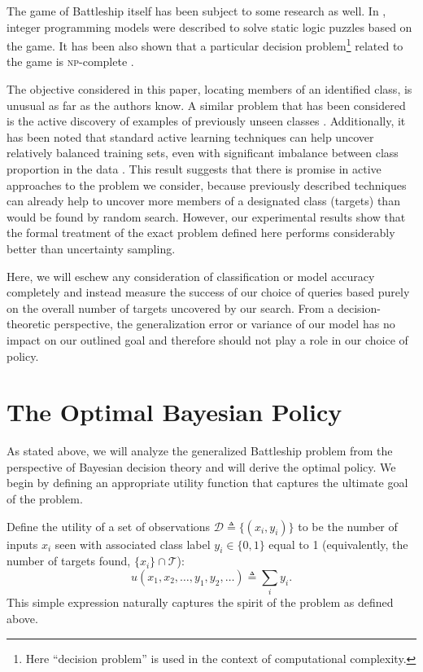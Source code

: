 \documentclass{acm_proc_article-sp}
\newcommand{\cm}[1]{\mathcal{#1}}
\newcommand{\data}{\cm{D}}
\begin{document}
The game of Battleship itself has been subject to some research as
well.  In \citep{solving}, integer programming models were described
to solve static logic puzzles based on the game.  It has been also
shown that a particular decision problem\footnote{Here ``decision
  problem'' is used in the context of computational complexity.}
related to the game is \textsc{np}-complete \citep{battleshipnp}.

The objective considered in this paper, locating members of an
identified class, is unusual as far as the authors know.  A similar
problem that has been considered is the active discovery of examples
of previously unseen classes \citep{rareclass}.  Additionally, it has
been noted that standard active learning techniques can help uncover
relatively balanced training sets, even with significant imbalance
between class proportion in the data \citep{activeimbalanced}.  This
result suggests that there is promise in active approaches to the
problem we consider, because previously described techniques can
already help to uncover more members of a designated class (targets)
than would be found by random search.  However, our experimental
results show that the formal treatment of the exact problem defined
here performs considerably better than uncertainty sampling.

Here, we will eschew any consideration of classification or model
accuracy completely and instead measure the success of our choice of
queries based purely on the overall number of targets uncovered by our
search.  From a decision-theoretic perspective, the generalization
error or variance of our model has no impact on our outlined goal and
therefore should not play a role in our choice of policy.

\section{The Optimal Bayesian Policy}
\label{optimal}

As stated above, we will analyze the generalized Battleship problem
from the perspective of Bayesian decision theory and will derive the
optimal policy.  We begin by defining an appropriate utility function
that captures the ultimate goal of the problem.

Define the utility of a set of observations $\data \triangleq
\bigl\lbrace (x_i, y_i) \bigr\rbrace$ to be the number of inputs $x_i$
seen with associated class label $y_i \in \lbrace 0, 1 \rbrace$ equal
to 1 (equivalently, the number of targets found, $\lbrace x_i \rbrace
\cap \cm{T}$):
\begin{equation*}
  u(x_1, x_2, \dotsc, y_1, y_2, \dotsc) \triangleq
  \sum_i y_i.
\end{equation*}
This simple expression naturally captures the spirit of the problem
as defined above.
\end{document}

